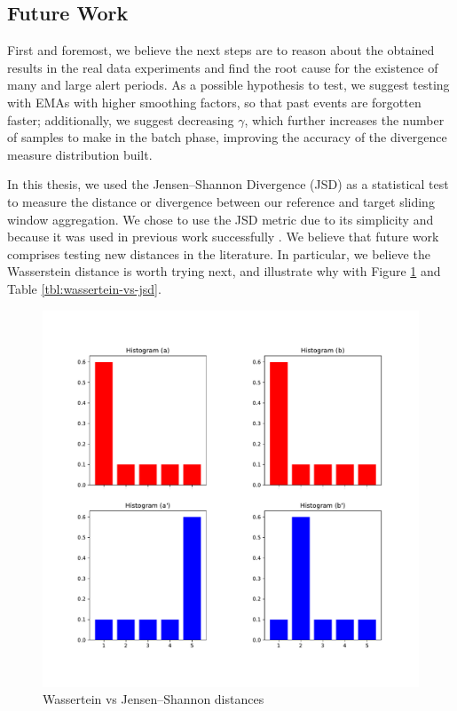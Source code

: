 \documentclass[sigconf]{acmart}
\begin{document}
\subsection{Future Work}

First and foremost, we believe the next steps are to reason about the obtained results in the real data experiments and find the root cause for the existence of many and large alert periods. As a possible hypothesis to test, we suggest testing with EMAs with higher smoothing factors, so that past events are forgotten faster; additionally, we suggest decreasing $\gamma$, which further increases the number of samples to make in the batch phase, improving the accuracy of the divergence measure distribution built.

In this thesis, we used the Jensen–Shannon Divergence (JSD) as a statistical test to measure the distance or divergence between our reference and target sliding window aggregation. We chose to use the JSD metric due to its simplicity and because it was used in previous work successfully \cite{SAMM}. We believe that future work comprises testing new distances in the literature. In particular, we believe the Wasserstein distance is worth trying next, and illustrate why with Figure \ref{fig:wasserteinvsjsd} and Table \ref{tbl:wassertein-vs-jsd}. 
\begin{figure}[!htb]
    \begin{center}
      \includegraphics[scale=0.3]{figures/wasserstein-vs-jsd.pdf}
      \caption{Wassertein vs Jensen–Shannon distances}
      \label{fig:wasserteinvsjsd}
    \end{center}
\end{figure}
\end{document}
